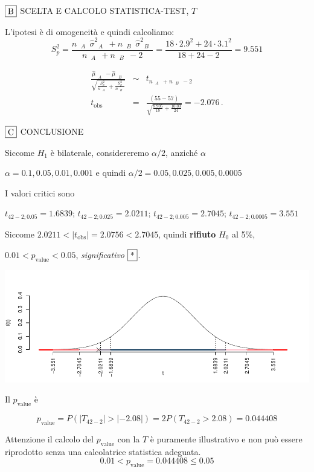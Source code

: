 \documentclass[
  11pt,
]{book}
\theoremstyle{mytheoremstyle}
\theoremstyle{mydefstyle}
\begin{document}
\(\fbox{B}\) SCELTA E CALCOLO STATISTICA-TEST, \(T\)

L'ipotesi è di omogeneità e quindi calcoliamo:\[
   S_p^2=\frac{n_\text{ $A$ }\hat\sigma^2_\text{ $A$ }+n_\text{ $B$ }\hat\sigma^2_\text{ $B$ }}{n_\text{ $A$ }+n_\text{ $B$ }-2} =
   \frac{ 18 \cdot 2.9 ^2+ 24 \cdot 3.1 ^2}{ 18 + 24 -2}= 9.551 
  \]

\begin{eqnarray*}
  \frac{\hat\mu_\text{ $A$ } - \hat\mu_\text{ $B$ }}
  {\sqrt{\frac {S^2_p}{n_\text{ $A$ }}+\frac {S^2_p}{n_\text{ $B$ }}}}&\sim&t_{n_\text{ $A$ }+n_\text{ $B$ }-2}\\
  t_{\text{obs}}
  &=& \frac{ ( 55 -  57 )} {\sqrt{\frac{ 8.905 }{ 18 }+\frac{ 10.03 }{ 24 }}}
  =   -2.076 \, .
  \end{eqnarray*}

\(\fbox{C}\) CONCLUSIONE

Siccome \(H_1\) è bilaterale, considereremo \(\alpha/2\),
anziché \(\alpha\)

\(\alpha=0.1, 0.05, 0.01, 0.001\) e quindi \(\alpha/2=0.05, 0.025, 0.005, 0.0005\)

I valori critici sono

\(t_{42-2;0.05}=1.6839\); \(t_{42-2;0.025}=2.0211\); \(t_{42-2;0.005}=2.7045\); \(t_{42-2;0.0005}=3.551\)

Siccome \(2.0211<|t_\text{obs}|=2.0756<2.7045\), quindi \textbf{rifiuto} \(H_0\) al 5\%,

\(0.01<p_\text{value}<0.05\), \emph{significativo} \(\fbox{*}\).

\begin{center}\includegraphics{Appunti_di_Statistica_2025_files/figure-latex/16-test-2C-2,-1} \end{center}

Il \(p_{\text{value}}\) è

\[ p_{\text{value}} = P(|T_{42-2}|>|-2.08|)=2P(T_{42-2}>2.08)=0.044408 \]

Attenzione il calcolo del \(p_\text{value}\) con la \(T\) è puramente illustrativo e non può essere riprodotto senza una calcolatrice statistica adeguata.\[
 0.01 < p_\text{value}= 0.044408 \leq 0.05 
\]
\end{document}
